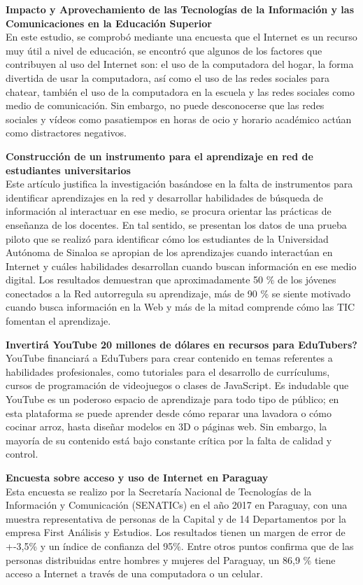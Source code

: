 \documentclass[runningheads]{llncs}
\begin{document}
\textbf{Impacto y Aprovechamiento de las Tecnologías de la Información y las Comunicaciones en la Educación Superior} \\
En este estudio, se comprobó mediante una encuesta que el Internet es un recurso muy útil a nivel de educación, se encontró que algunos de los factores que contribuyen al uso del Internet son: el uso de la computadora del hogar, la forma divertida de usar la computadora, así como el uso de las redes sociales para chatear, también el uso de la computadora en la escuela y las redes sociales como medio de comunicación. Sin embargo, no puede desconocerse que las redes sociales y vídeos como pasatiempos en horas de ocio y horario académico actúan como distractores negativos.\cite{9}

\textbf{Construcción de un instrumento para el aprendizaje en red de estudiantes universitarios}\\
Este artículo justifica la investigación basándose en la falta de instrumentos para identificar aprendizajes en la red y desarrollar habilidades de búsqueda de información al interactuar en ese medio, se procura orientar las prácticas de enseñanza de los docentes. En tal sentido, se presentan los datos de una prueba piloto que se realizó para identificar cómo los estudiantes de la Universidad Autónoma de Sinaloa se apropian de los aprendizajes cuando interactúan en Internet y cuáles habilidades desarrollan cuando buscan información en ese medio digital. Los resultados demuestran que aproximadamente 50 \% de los jóvenes conectados a la Red autorregula su aprendizaje, más de 90 \% se siente motivado cuando busca información en la Web y más de la mitad comprende cómo las TIC fomentan el aprendizaje.\cite{10}

\textbf{Invertirá YouTube 20 millones de dólares en recursos para EduTubers?} \\
YouTube financiará a EduTubers para crear contenido en temas referentes a habilidades profesionales, como tutoriales para el desarrollo de currículums, cursos de programación de videojuegos o clases de JavaScript. Es indudable que YouTube es un poderoso espacio de aprendizaje para todo tipo de público; en esta plataforma se puede aprender desde cómo reparar una lavadora o cómo cocinar arroz, hasta diseñar modelos en 3D o páginas web. Sin embargo, la mayoría de su contenido está bajo constante crítica por la falta de calidad y control.\cite{11} 

\textbf{Encuesta sobre acceso y uso de Internet en Paraguay}\\
Esta encuesta se realizo por la Secretaría Nacional de Tecnologías de la Información y Comunicación (SENATICs) en el año 2017 en Paraguay, con una muestra representativa de personas de la Capital y de 14 Departamentos por la empresa First Análisis y Estudios. Los resultados tienen un margen de error de +-3,5\% y un índice de confianza del 95\%. Entre otros puntos confirma que de las personas distribuidas entre hombres y mujeres del Paraguay, un 86,9 \% tiene acceso a Internet a través de una computadora o un celular.\cite{2} 
\end{document}

